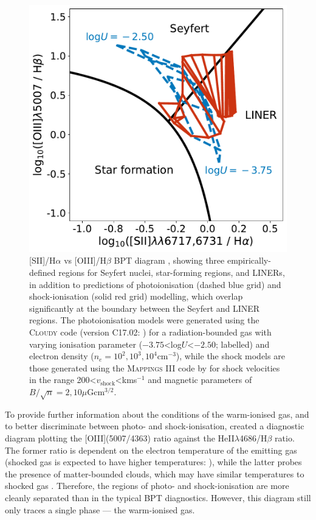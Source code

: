 \begin{figure}
    \centering
    \includegraphics[width=0.75\linewidth]{figures/introduction/bpt_diagram_photo_shock_ionisation.pdf}
    \caption[{[SII]/H$\alpha$ vs [OIII]/H$\beta$ BPT \citep{Baldwin1981, Kewley2006} diagram with shock and photoionisation modelling.}]{[SII]/H$\alpha$ vs [OIII]/H$\beta$ BPT diagram \citep{Baldwin1981}, showing three empirically-defined regions \citep{Kewley2006} for Seyfert nuclei, star-forming regions, and LINERs, in addition to predictions of photoionisation (dashed blue grid) and shock-ionisation (solid red grid) modelling, which overlap significantly at the boundary between the Seyfert and LINER regions. The photoionisation models were generated using the \textsc{Cloudy} code (version C17.02: \citealt{Ferland2017}) for a radiation-bounded gas with varying ionisation parameter ($-3.75$\;\textless\;log$U$\;\textless\;$-2.50$; labelled) and electron density ($n_e=10^2,10^3,10^4$\;cm$^{-3}$), while the shock models are those generated using the \textsc{Mappings III} code by \citet{Allen2008} for shock velocities in the range 200\;\textless\;$v_\mathrm{shock}$\;\textless{}\;km\;s$^{-1}$ and magnetic parameters of $B/\sqrt{n}=2,10$\;$\mu$G\;cm$^{3/2}$.}
    \label{fig: introduction: outflows: acceleration_mechanisms: bpt_diagram_photo_shock_ionisation}
\end{figure}

To provide further information about the conditions of the warm-ionised gas, and to better discriminate between photo- and shock-ionisation, \citet{VillarMartin1999} created a diagnostic diagram plotting the [OIII](5007/4363) ratio against the He\;II$\lambda$4686/H$\beta$ ratio. The former ratio is dependent on the electron temperature of the emitting gas (shocked gas is expected to have higher temperatures: \citealt{Fosbury1978}), while the latter probes the presence of matter-bounded clouds, which may have similar temperatures to shocked gas \citep{Binette1996}. Therefore, the regions of photo- and shock-ionisation are more cleanly separated than in the typical BPT diagnostics. However, this diagram still only traces a single phase --- the warm-ionised gas.

